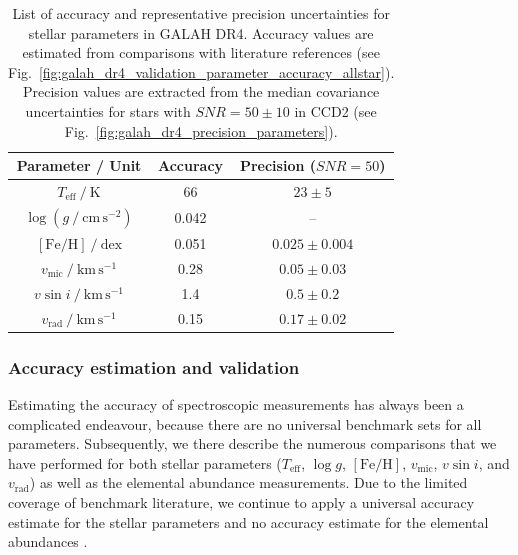 \documentclass[
  journal=pasa,
  manuscript=research-paper, %
  year=2023,
  volume=37
]{cup-journal}
\newcommand{\SB}[1]{{\textcolor{purple}{#1}}}
\newcommand{\Teff}{$T_\mathrm{eff}$\xspace}
\newcommand{\logg}{$\log g$\xspace}
\newcommand{\feh}{$\mathrm{[Fe/H]}$\xspace}
\newcommand{\vmic}{$v_\mathrm{mic}$\xspace}
\newcommand{\vsini}{$v \sin i$\xspace}
\newcommand{\vrad}{$v_\mathrm{rad}$\xspace}
\begin{document}
\begin{table}
\centering
\caption{List of accuracy and representative precision uncertainties for stellar parameters in GALAH DR4. Accuracy values are estimated from comparisons with literature references (see Fig.~\ref{fig:galah_dr4_validation_parameter_accuracy_allstar}). Precision values are extracted from the median covariance uncertainties for stars with $SNR = 50 \pm 10$ in CCD2 (see Fig.~\ref{fig:galah_dr4_precision_parameters}).}
\label{tab:accuracy_precision}
\begin{tabular}{ccc}
\hline \hline
Parameter / Unit & Accuracy & Precision ($SNR = 50$)\\
\hline
$T_\text{eff}~/~\mathrm{K}$          & 66     & $23 \pm 5$ \\
$\log (g~/~\mathrm{cm\,s^{-2}})$     &  0.042 & -- \\
$\mathrm{[Fe/H]}~/~\mathrm{dex}$     &  0.051 & $0.025 \pm 0.004$ \\
$v_\text{mic}~/~\mathrm{km\,s^{-1}}$ &  0.28  & $0.05 \pm 0.03$ \\
$v \sin i~/~\mathrm{km\,s^{-1}}$     &  1.4   & $0.5 \pm 0.2$ \\
$v_\text{rad}~/~\mathrm{km\,s^{-1}}$ &  0.15  & $0.17 \pm 0.02$ \\
\hline
\end{tabular}
\end{table}

\subsubsection{Accuracy estimation and validation} \label{sec:uncertainty_accuracy}

Estimating the accuracy of spectroscopic measurements has always been a complicated endeavour, because there are no universal benchmark sets for all parameters. Subsequently, we there describe the numerous comparisons that we have performed for both stellar parameters (\Teff, \logg, \feh, \vmic, \vsini, and \vrad) as well as the elemental abundance measurements. Due to the limited coverage of benchmark literature, we continue to apply a universal accuracy estimate for the stellar parameters and no accuracy estimate for the elemental abundances \citep[as for GALAH DR3][]{Buder2021}.

\end{document}
